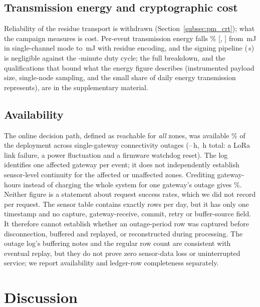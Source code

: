 \documentclass[a4paper,fleqn]{cas-dc}
\begin{document}
\subsection{Transmission energy and cryptographic cost}
\label{subsec:integrity}

Reliability of the residue transport is withdrawn (Section~\ref{subsec:pm_crt});
what the campaign measures is cost. Per-event transmission energy falls
\EnergyReductionPct\% [\EnergyReductionCILow, \EnergyReductionCIHigh] from
\EnergySingle\,mJ in single-channel mode to \EnergyCRT\,mJ with residue
encoding, and the signing pipeline (\SignTotal\,\textmu{}s) is negligible
against the \DutyCycleMinutes-minute duty cycle; the full breakdown, and
the qualifications that bound what the energy figure describes (instrumented
payload size, single-node sampling, and the small share of daily energy
transmission represents), are in the supplementary material.

\subsection{Availability}
\label{subsec:availability}

The online decision path, defined as reachable for \emph{all} zones, was
available \UptimePct\% of the deployment across \OutageCount{}
single-gateway connectivity outages (\OutageHoursMin--\OutageHoursMax\,h,
\OutageHoursTotal\,h total: a LoRa link failure, a power fluctuation and a
firmware watchdog reset). The log identifies one affected gateway per event;
it does not independently establish sensor-level continuity for the affected
or unaffected zones. Crediting gateway-hours instead of charging the whole
system for one gateway's outage gives \UptimeGatewayHoursPct\%. Neither
figure is a statement about request success rates, which we did not
record per request. The sensor table contains exactly \WritesPerDay{} rows
per day, but it has only one timestamp and no capture, gateway-receive,
commit, retry or buffer-source field. It therefore cannot establish whether
an outage-period row was captured before disconnection, buffered and replayed,
or reconstructed during processing. The outage log's buffering notes and the
regular row count are consistent with eventual replay, but they do not prove
zero sensor-data loss or uninterrupted service; we report availability and
ledger-row completeness separately.

\FloatBarrier
\section{Discussion}
\label{sec:discussion}
\label{sec:audit}
\end{document}
